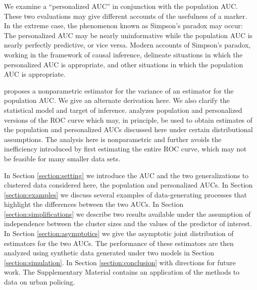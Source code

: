 \documentclass[12pt]{article}
\newcommand{\comment}[1]{
  \iftoggle{commenttoggle}{
    {\normalsize{\color{red}{ #1}}\normalsize}
  }
  {}
}
\begin{document}
We examine a ``personalized AUC'' in conjunction with the population
AUC.  These two evaluations may give different accounts of the
usefulness of a marker. In the extreme case, the phenomenon known as
Simpson's paradox may occur: The personalized AUC may be nearly
uninformative while the population AUC is nearly perfectly
predictive, or vice versa. Modern accounts of Simpson's paradox,
working in the framework of causal inference, delineate situations in
which the personalized AUC is appropriate, and other situations in which
the population AUC is appropriate.


\citet{obuchowski1997} proposes a nonparametric estimator for the
variance of an estimator for the population AUC. We give an alternate
derivation here. We also clarify the statistical model and target of
inference. \citet{michael2019} analyzes population and personalized
versions of the ROC curve which may, in principle, be used to obtain
estimates of the population and personalized AUCs discussed here under
certain distributional assumptions. The analysis here is nonparametric
and further avoids the inefficiency introduced by first estimating the
entire ROC
curve, which may not be feasible for many smaller data sets.%

In Section \ref{section:setting} we introduce the AUC and the two
generalizations to clustered data considered here, the population and
personalized AUCs. In Section \ref{section:examples} we discuss
several examples of data-generating processes that highlight the
differences between the two AUCs. In Section
\ref{section:simplifications} we describe two results available under
the assumption of independence between the cluster sizes and the
values of the predictor of interest. In Section
\ref{section:asymptotics} we give the asymptotic joint distribution of
estimators for the two AUCs. The performance of these estimators are
then analyzed using synthetic data generated under two models in
Section \ref{section:simulation}. In Section \ref{section:conclusion}
with directions for future work. The Supplementary Material contains
an application of the methods to data on urban policing.


\end{document}
